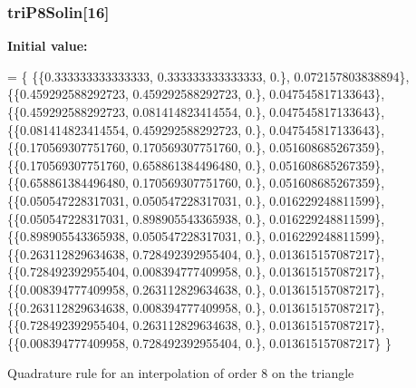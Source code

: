 \subsubsection[{tri\-P8\-Solin}]{ tri\-P8\-Solin[16]}\label{GaussQuadratureTri_8cc_a91a7584c2ed57e0302857ae4ea79fd5d}
{\bfseries Initial value\-:}
\begin{DoxyCode}
= \{
  \{\{0.333333333333333, 0.333333333333333, 0.\}, 0.072157803838894\},
  \{\{0.459292588292723, 0.459292588292723, 0.\}, 0.047545817133643\},
  \{\{0.459292588292723, 0.081414823414554, 0.\}, 0.047545817133643\},
  \{\{0.081414823414554, 0.459292588292723, 0.\}, 0.047545817133643\},
  \{\{0.170569307751760, 0.170569307751760, 0.\}, 0.051608685267359\},
  \{\{0.170569307751760, 0.658861384496480, 0.\}, 0.051608685267359\},
  \{\{0.658861384496480, 0.170569307751760, 0.\}, 0.051608685267359\},
  \{\{0.050547228317031, 0.050547228317031, 0.\}, 0.016229248811599\},
  \{\{0.050547228317031, 0.898905543365938, 0.\}, 0.016229248811599\},
  \{\{0.898905543365938, 0.050547228317031, 0.\}, 0.016229248811599\},
  \{\{0.263112829634638, 0.728492392955404, 0.\}, 0.013615157087217\},
  \{\{0.728492392955404, 0.008394777409958, 0.\}, 0.013615157087217\},
  \{\{0.008394777409958, 0.263112829634638, 0.\}, 0.013615157087217\},
  \{\{0.263112829634638, 0.008394777409958, 0.\}, 0.013615157087217\},
  \{\{0.728492392955404, 0.263112829634638, 0.\}, 0.013615157087217\},
  \{\{0.008394777409958, 0.728492392955404, 0.\}, 0.013615157087217\}
\}
\end{DoxyCode}
Quadrature rule for an interpolation of order 8 on the triangle 
